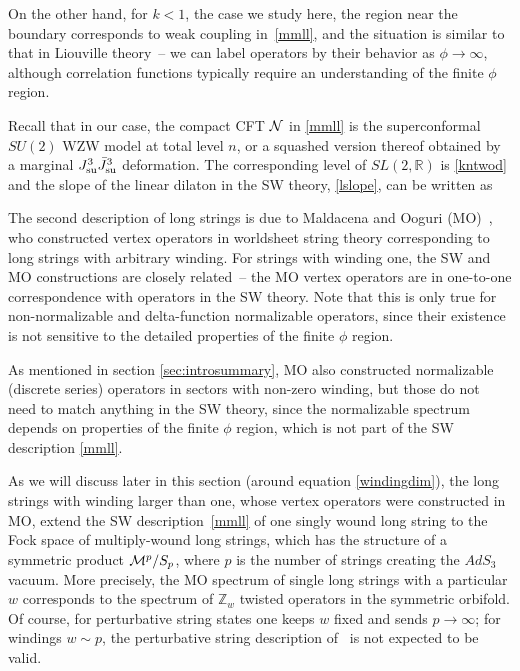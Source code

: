 \documentclass[12pt]{article}
\def\sltwo{\ensuremath{SL(2,\bR)}}
\def\MM{{\mathcal{M}}}
\def\NN{{\mathcal{N}}}
\newcommand{\bR}{{\mathbb R}}
\newcommand{\bZ}{{\mathbb Z}}
\numberwithin{equation}{section}
\def\MM{{\cal M}}
\def\NN{{\cal N}}
\begin{document}
On the other hand, for $k<1$, the case we study here, the region near the boundary corresponds to weak coupling in~\eqref{mmll}, and the situation is similar to that in Liouville theory~-- we can label operators by their behavior as $\phi\to\infty$, although correlation functions typically require an understanding of the finite $\phi$ region. 



Recall that in our case, the compact CFT $\NN$ in \eqref{mmll} is 
\eqn[sutwon]{\NN=SU(2)_n ~,}
the superconformal $SU(2)$ WZW model at total level $n$, or a squashed version thereof obtained by a marginal $J^3_{\rm su}\bar J^3_{\rm su}$ deformation. The corresponding level of $\sltwo$ is \eqref{kntwod}
and the slope of the linear dilaton in the SW theory, \eqref{lslope}, can be written as

The second description of long strings is due to Maldacena and Ooguri (MO)~, who constructed vertex operators in worldsheet string theory corresponding to long strings with arbitrary winding. For strings with winding one, the SW and MO constructions are closely related~-- the MO vertex operators are in one-to-one correspondence with operators in the SW theory. Note that this is only true for non-normalizable and delta-function normalizable operators, since their existence is not sensitive to the detailed properties of the finite $\phi$ region. 

As mentioned in section \ref{sec:introsummary}, MO also constructed normalizable (discrete series) operators in sectors with non-zero winding, but those do not need to match anything in the SW theory, since the normalizable spectrum depends on properties of the finite $\phi$ region, which is not part of the SW description  \eqref{mmll}. 

As we will discuss later in this section (around equation \eqref{windingdim}), the long strings with winding larger than one, whose vertex operators were constructed in MO, extend the SW description~\eqref{mmll} of one singly wound long string to the Fock space of multiply-wound long strings, which has the structure of a symmetric product $\MM^p/S_p$, where $p$ is the number of strings creating the $AdS_3$ vacuum. 
More precisely, the MO spectrum of single long strings with a particular $w$ corresponds to the spectrum of $\bZ_w$ twisted operators in the symmetric orbifold. Of course, for perturbative string states one keeps $w$ fixed and sends $p\to\infty$; for windings $w\sim p$, the perturbative string description of~ is not expected to be valid.%
\end{document}

